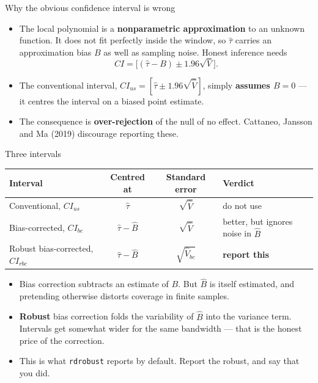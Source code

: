 \documentclass[
  11pt,
  ignorenonframetext,
  aspectratio=169,
]{beamer}
\providecommand{\tightlist}{%
  \setlength{\itemsep}{0pt}\setlength{\parskip}{0pt}}
\begin{document}
\begin{frame}{Why the obvious confidence interval is wrong}
\protect{}\label{why-the-obvious-confidence-interval-is-wrong}
\begin{itemize}
\tightlist
\item
  The local polynomial is a \textbf{nonparametric approximation} to an
  unknown function. It does not fit perfectly inside the window, so
  \(\hat\tau\) carries an approximation bias \(B\) as well as sampling
  noise. Honest inference needs \[
  CI = \big[(\hat\tau - B) \pm 1.96 \sqrt{V}\big].
  \]
\item
  The conventional interval,
  \(CI_{us} = [\hat\tau \pm 1.96\sqrt{\hat V}]\), simply \textbf{assumes
  \(B = 0\)} --- it centres the interval on a biased point estimate.
\item
  The consequence is \textbf{over-rejection} of the null of no effect.
  Cattaneo, Jansson and Ma (2019) discourage reporting these.
\end{itemize}
\end{frame}

\begin{frame}[fragile]{Three intervals}
\protect{}\label{three-intervals}
\begin{center}
\small
\begin{tabular}{lccl}
\toprule
Interval & Centred at & Standard error & Verdict \\
\midrule
Conventional, $CI_{us}$        & $\hat\tau$          & $\sqrt{\hat V}$      & do not use \\
Bias-corrected, $CI_{bc}$      & $\hat\tau - \hat B$ & $\sqrt{\hat V}$      & better, but ignores noise in $\hat B$ \\
Robust bias-corrected, $CI_{rbc}$ & $\hat\tau - \hat B$ & $\sqrt{\hat V_{bc}}$ & \textbf{report this} \\
\bottomrule
\end{tabular}
\end{center}

\begin{itemize}
\tightlist
\item
  Bias correction subtracts an estimate of \(B\). But \(\hat B\) is
  itself estimated, and pretending otherwise distorts coverage in finite
  samples.
\item
  \textbf{Robust} bias correction folds the variability of \(\hat B\)
  into the variance term. Intervals get somewhat wider for the same
  bandwidth --- that is the honest price of the correction.
\item
  This is what \texttt{rdrobust} reports by default. Report the robust,
  and say that you did.
\end{itemize}
\end{frame}
\end{document}
